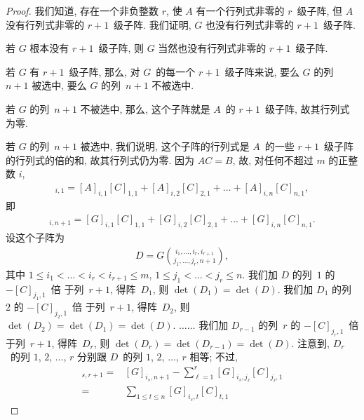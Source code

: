 \begin{proof}
    我们知道, 存在一个非负整数 \(r\),
    使 \(A\) 有一个行列式非零的 \(r\)~级子阵,
    但 \(A\) 没有行列式非零的 \(r+1\)~级子阵.
    我们证明,
    \(G\) 也没有行列式非零的 \(r+1\)~级子阵.

    若 \(G\) 根本没有 \(r+1\)~级子阵,
    则 \(G\) 当然也没有行列式非零的 \(r+1\)~级子阵.

    若 \(G\) 有 \(r+1\)~级子阵,
    那么,
    对 \(G\)~的每一个 \(r+1\)~级子阵来说,
    要么 \(G\) 的列~\(n+1\) 被选中,
    要么 \(G\) 的列~\(n+1\) 不被选中.

    若 \(G\) 的列~\(n+1\) 不被选中,
    那么, 这个子阵就是 \(A\)~的 \(r+1\)~级子阵,
    故其行列式为零.

    若 \(G\) 的列~\(n+1\) 被选中,
    我们说明,
    这个子阵的行列式是
    \(A\)~的一些 \(r+1\)~级子阵的行列式的倍的和,
    故其行列式仍为零.
    因为 \(AC = B\), 故,
    对任何不超过 \(m\) 的正整数 \(i\),
    \begin{align*}
        [B]_{i,1}
            = [A]_{i,1} [C]_{1,1} + [A]_{i,2} [C]_{2,1}
        + \dots + [A]_{i,n} [C]_{n,1},
    \end{align*}
    即
    \begin{align*}
        [G]_{i,n+1}
        = [G]_{i,1} [C]_{1,1} + [G]_{i,2} [C]_{2,1}
        + \dots + [G]_{i,n} [C]_{n,1}.
    \end{align*}
    设这个子阵为
    \begin{align*}
        D = G\binom{i_1,\dots,i_r,i_{r+1}}{j_1,\dots,j_r,n+1},
    \end{align*}
    其中
    \(1 \leq i_1 < \dots < i_r < i_{r+1} \leq m\),
    \(1 \leq j_1 < \dots < j_r \leq n\).
    我们加 \(D\) 的列~\(1\) 的 \(-[C]_{j_1,1}\)~倍%
    于列~\(r+1\),
    得阵~\(D_1\),
    则 \(\det {(D_1)} = \det {(D)}\).
    我们加 \(D_1\) 的列~\(2\) 的 \(-[C]_{j_2,1}\)~倍%
    于列~\(r+1\),
    得阵~\(D_2\),
    则 \(\det {(D_2)} = \det {(D_1)} = \det {(D)}\).
    \(\dots \dots\)
    我们加 \(D_{r-1}\) 的列~\(r\) 的 \(-[C]_{j_r,1}\)~倍%
    于列~\(r+1\),
    得阵~\(D_r\),
    则 \(\det {(D_r)} = \det {(D_{r-1})} = \det {(D)}\).
    注意到, \(D_r\)~的列
    \(1\), \(2\), \(\dots\), \(r\)
    分别跟 \(D\)~的列
    \(1\), \(2\), \(\dots\), \(r\)
    相等;
    不过,
    \begin{align*}
        [D_r]_{s,r+1}
        = {} &
        [G]_{i_s,n+1}
        - \sum_{\ell = 1}^{r}
        {[G]_{i_s,j_\ell} [C]_{j_\ell,1}}
        \\
        = {} &
        \sum_{1 \leq t \leq n}
        {[G]_{i_s,t} [C]_{t,1}}

\end{align*}
\end{proof}
